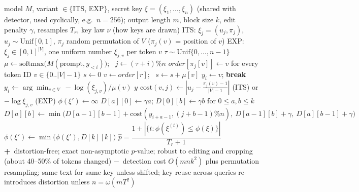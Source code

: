 \documentclass[10pt,a4paper,twocolumn]{article}
\newcommand{\pro}[1]{\Statex\textcolor{proc}{\textbf{+}\ #1}}
\newcommand{\con}[1]{\Statex\textcolor{conc}{\textbf{$-$}\ #1}}
\begin{document}
\begin{algorithm}[H]\small
\caption{EXP-EDIT family (Kuditipudi et al.\ 2023)}
\begin{algorithmic}[1]
\Require model $M$, variant $\in\{$ITS, EXP$\}$, secret key $\xi=(\xi_1,\dots,\xi_n)$ (shared with detector, used cyclically, e.g.\ $n=256$); output length $m$, block size $k$, edit penalty $\gamma$, resamples $T_r$, key law $\nu$ (how keys are drawn)
\Statex \quad ITS: $\xi_j=(u_j,\pi_j)$, $u_j\sim\mathrm{Unif}[0,1]$, $\pi_j$ random permutation of $V$ ($\pi_j(v)$ = position of $v$)
\Statex \quad EXP: $\xi_j\in[0,1]^{|V|}$, one uniform number $\xi_{j,v}$ per token $v$
 \State $\tau\sim\mathrm{Unif}\{0,\dots,n-1\}$ 
  \State $\mu\gets\mathrm{softmax}\big(M(\text{prompt},y_{<i})\big)$; \ $j\gets(\tau+i)\%n$
   \State $\mathit{order}[\pi_j[v]]\gets v$ for every token ID $v\in\{0..|V|-1\}$ 
   \State $s\gets0$
    \State $v\gets\mathit{order}[r]$; \ $s\gets s+\mu[v]$ 
     \State $y_i\gets v$; \textbf{break}  \EndIf
   \EndFor
  \Else
   \State $y_i\gets\arg\min_{v\in V}\ -\log(\xi_{j,v})/\mu(v)$
  \EndIf
 \EndFor
 \State \Return $y$
\EndProcedure
{} 
 \State $\mathrm{cost}(v,j)\gets|u_j-\tfrac{\pi_j(v)-1}{|V|-1}|$ (ITS) or $-\log\xi_{j,v}$ (EXP) 
  \State $\phi(\xi')\gets\infty$
   \State $D[a][0]\gets\gamma a$; $D[0][b]\gets\gamma b$ for $0\le a,b\le k$
   \State $D[a][b]\gets\min\big(D[a-1][b-1]+\mathrm{cost}(y_{i+a-1},(j+b-1)\%n),\ D[a-1][b]+\gamma,\ D[a][b-1]+\gamma\big)$
   \State $\phi(\xi')\gets\min\big(\phi(\xi'),D[k][k]\big)$ 
  \EndFor
 \EndFor
 \State \Return $\hat p=\dfrac{1+|\{t:\phi(\xi^{(t)})\le\phi(\xi)\}|}{T_r+1}$ 
\EndProcedure
\pro{distortion-free; exact non-asymptotic $p$-value; robust to editing and cropping (about 40--50\% of tokens changed)}
\con{detection cost $O(mnk^2)$ plus permutation resampling; same text for same key unless shifted; key reuse across queries re-introduces distortion unless $n=\omega(mT^2)$}
\end{algorithmic}
\end{algorithm}
\end{document}
